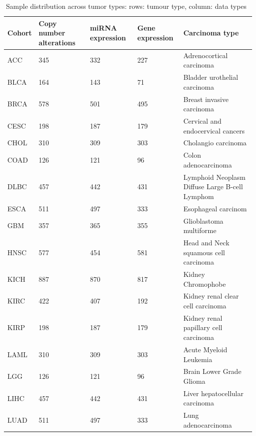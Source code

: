 
\begin{table} [h]
\centering
    \scriptsize
    \caption{Sample distribution across tumor types: rows: tumour type, column: data types~\cite{weinstein2013cancer}}
    \label{table:alldatadetails2}
    \vspace{-2mm}
    \begin{tabular}{l|l|l|l|l}
        \hline
        \rowcolor{Gray}
         \textbf{Cohort} & \textbf{Copy number alterations} & \textbf{miRNA expression} & \textbf{Gene expression} & \textbf{Carcinoma type} \\\hline
            ACC & 345 & 332 & 227 & Adrenocortical carcinoma \\\hline
            BLCA & 164 & 143 & 71 & Bladder urothelial carcinoma \\\hline%
            BRCA  & 578 & 501 & 495 & Breast invasive carcinoma \\\hline
            CESC & 198 & 187 & 179 & Cervical and endocervical cancers	\\\hline%
            CHOL & 310 & 309 & 303 & Cholangio carcinoma \\\hline 
            COAD & 126 & 121 & 96 & Colon adenocarcinoma \\\hline 
            DLBC & 457 & 442 & 431 & Lymphoid Neoplasm Diffuse Large B-cell Lymphom  \\\hline
            ESCA & 511 & 497 & 333 & Esophageal carcinom \\\hline
            GBM & 357 & 365 & 355 & Glioblastoma multiforme \\\hline
            HNSC   & 577 & 454 & 581 & Head and Neck squamous cell carcinoma \\\hline
            KICH & 887 & 870 & 817 & Kidney Chromophobe  \\\hline
            KIRC & 422 & 407 & 192 & Kidney renal clear cell carcinoma \\\hline
            KIRP & 198 & 187 & 179 & Kidney renal papillary cell carcinoma	\\\hline%
            LAML & 310 & 309 & 303 & Acute Myeloid Leukemia \\\hline 
            LGG & 126 & 121 & 96 & Brain Lower Grade Glioma \\\hline 
            LIHC & 457 & 442 & 431 & Liver hepatocellular carcinoma  \\\hline
            LUAD & 511 & 497 & 333 & Lung adenocarcinoma \\\hline

\end{tabular}
\end{table}
